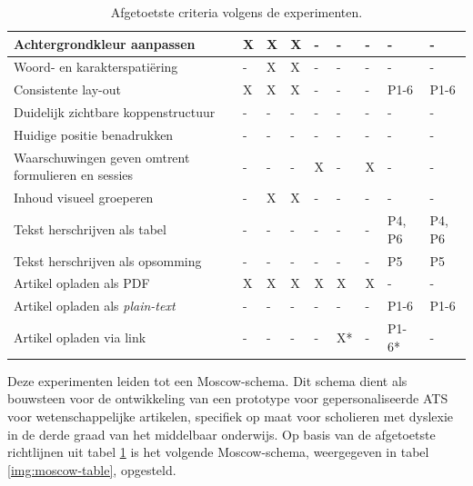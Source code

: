 \begin{table}[H]
\begin{tabular}{ | m{8cm} | m{0.5cm} | m{0.5cm} | m{0.5cm} | m{0.5cm} | m{0.5cm} | m{0.5cm} | m{1cm} | m{1cm} | }
		Achtergrondkleur aanpassen & X & X & X & - & - & - & - & - \\ \hline
		Woord- en karakterspatiëring & - & X & X & - & - & - & - & - \\ \hline
		Consistente lay-out & X & X & X & - & - & - & P1-6 & P1-6 \\ \hline
		Duidelijk zichtbare koppenstructuur & - & - & - & - & - & - & - & - \\ \hline
		Huidige positie benadrukken & - & - & - & - & - & - & - & - \\ \hline
		Waarschuwingen geven omtrent formulieren en sessies & - & - & - & X & - & X & - & - \\ \hline
		Inhoud visueel groeperen & - & X & X & - & - & - & - & - \\ \hline
		Tekst herschrijven als tabel & - & - & - & - & - & - & P4, P6 & P4, P6 \\ \hline
		Tekst herschrijven als opsomming & - & - & - & - & - & - & P5 & P5 \\ \hline
		Artikel opladen als PDF & X & X & X & X & X & X & - & - \\ \hline
		Artikel opladen als \textit{plain-text} & - & - & - & - & - & - & P1-6 & P1-6 \\ \hline
		Artikel opladen via link & - & - & - & - & X* & - & P1-6* & - \\ \hline
	\end{tabular}
\caption{Afgetoetste criteria volgens de experimenten.}
\label{table:afgetoetste-criteria}
\end{table}

Deze experimenten leiden tot een Moscow-schema. Dit schema dient als bouwsteen voor de ontwikkeling van een prototype voor gepersonaliseerde ATS voor wetenschappelijke artikelen, specifiek op maat voor scholieren met dyslexie in de derde graad van het middelbaar onderwijs. Op basis van de afgetoetste richtlijnen uit tabel \ref{table:afgetoetste-criteria} is het volgende Moscow-schema, weergegeven in tabel \ref{img:moscow-table}, opgesteld.


